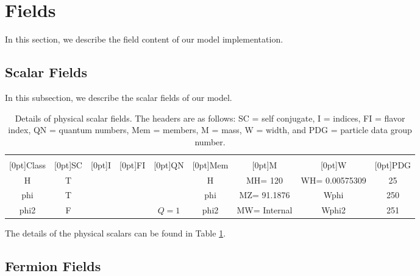\section{\label{fields}Fields}
In this section, we describe the field content of our model implementation.
\subsection{\label{scalars}Scalar Fields}
In this subsection, we describe the scalar fields of our model.  \begin{table}[!h]
\begin{center}
\begin{tabular}{|c|c|c|c|c|c|c|c|c|}
\hline
 &  &  &  &  &  &  &  & \\
\raisebox{1.5ex}[0pt]{Class} & \raisebox{1.5ex}[0pt]{SC} & \raisebox{1.5ex}[0pt]{I} & \raisebox{1.5ex}[0pt]{FI} & \raisebox{1.5ex}[0pt]{QN} & \raisebox{1.5ex}[0pt]{Mem} & \raisebox{1.5ex}[0pt]{M} & \raisebox{1.5ex}[0pt]{W} & \raisebox{1.5ex}[0pt]{PDG}\\
\hline\hline
H & T & {} & {} & & H & {MH= 120} & {WH= 0.00575309} & 25\\
phi & T & {} & {} & & phi & {MZ= 91.1876} & Wphi & 250\\
phi2 & F & {} & {} & $Q = 1$ & phi2 & {MW= Internal} & Wphi2 & 251\\
\hline
\end{tabular}
\caption[Physical Scalar Fields]{\label{tab:scalars:physical:1}Details of physical scalar fields.  The headers are as follows:  SC = self conjugate, I = indices, FI = flavor index, QN = quantum numbers, Mem = members, M = mass, W = width, and PDG = particle data group number.}
\end{center}
\end{table}
The details of the physical scalars can be found in Table \ref{tab:scalars:physical:1}.  \subsection{\label{fermions}Fermion Fields}
